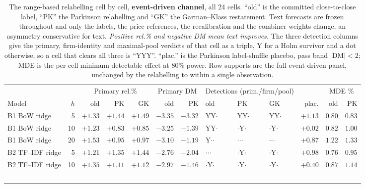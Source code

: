 \begin{table}[p]
\centering
\caption[The range-based relabelling, event-driven cells]{The range-based
relabelling cell by cell, \textbf{event-driven channel}, all 24 cells.
``old'' is the committed close-to-close label, ``PK'' the Parkinson
relabelling and ``GK'' the Garman--Klass restatement. Text forecasts are
frozen throughout and only the labels, the price references, the
recalibration and the combiner weights change, an asymmetry conservative
for text. \emph{Positive rel.\% and negative DM mean text improves.} The
three detection columns give the primary, firm-identity and maximal-pool
verdicts of that cell as a triple, Y for a Holm survivor and a dot
otherwise, so a cell that clears all three is ``YYY''. ``plac.'' is the
Parkinson label-shuffle placebo, pass band $|\mathrm{DM}|<2$; MDE is the
per-cell minimum detectable effect at 80\% power. Row supports are the full
event-driven panel, unchanged by the relabelling to within a single
observation.}
\label{tab:app-range-ed}
\singlespacing\footnotesize
\setlength{\tabcolsep}{3pt}
\begin{tabular}{@{}lrrrrrrlllrrr@{}}
\toprule
& & \multicolumn{3}{c}{Primary rel.\%} & \multicolumn{2}{c}{Primary DM} & \multicolumn{3}{c}{Detections (prim./firm/pool)} & & \multicolumn{2}{c}{MDE \%} \\
\cmidrule(lr){3-5}\cmidrule(lr){6-7}\cmidrule(lr){8-10}\cmidrule(lr){12-13}
Model & $h$ & old & PK & GK & old & PK & old & PK & GK & plac. & old & PK \\
\midrule
B1 BoW ridge & 5 & $+1.33$ & $+1.44$ & $+1.49$ & $-3.35$ & $-3.32$ & YY$\cdot$ & YY$\cdot$ & YY$\cdot$ & $+1.13$ & $0.80$ & $0.83$ \\
B1 BoW ridge & 10 & $+1.23$ & $+0.83$ & $+0.85$ & $-3.25$ & $-1.39$ & YY$\cdot$ & $\cdot$Y$\cdot$ & $\cdot$Y$\cdot$ & $+0.02$ & $0.82$ & $1.00$ \\
B1 BoW ridge & 20 & $+1.53$ & $+0.95$ & $+0.97$ & $-3.10$ & $-1.19$ & Y$\cdot$$\cdot$ & $\cdot$$\cdot$$\cdot$ & $\cdot$$\cdot$$\cdot$ & $+0.87$ & $1.22$ & $1.33$ \\
\addlinespace
B2 TF--IDF ridge & 5 & $+1.21$ & $+1.35$ & $+1.44$ & $-2.76$ & $-2.04$ & $\cdot$$\cdot$$\cdot$ & $\cdot$Y$\cdot$ & $\cdot$Y$\cdot$ & $+0.98$ & $0.76$ & $0.95$ \\
B2 TF--IDF ridge & 10 & $+1.35$ & $+1.11$ & $+1.12$ & $-2.97$ & $-1.46$ & $\cdot$Y$\cdot$ & $\cdot$Y$\cdot$ & $\cdot$Y$\cdot$ & $+0.40$ & $0.87$ & $1.14$ \\
$$
\end{tabular}
\end{table}
